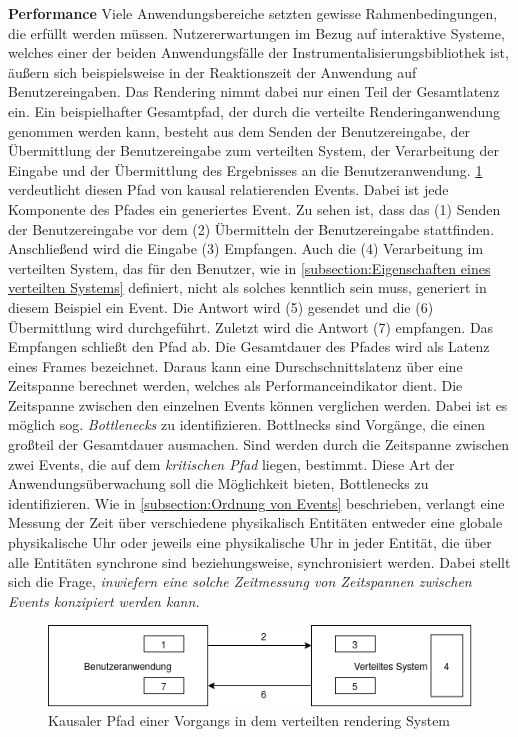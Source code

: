 \textbf{Performance} \space\space\space 
Viele Anwendungsbereiche setzten gewisse Rahmenbedingungen, die erfüllt werden müssen. 
Nutzererwartungen im Bezug auf interaktive Systeme, welches einer der beiden Anwendungsfälle der Instrumentalisierungsbibliothek ist, äußern sich beispielsweise in der Reaktionszeit der Anwendung auf Benutzereingaben. 
Das Rendering nimmt dabei nur einen Teil der Gesamtlatenz ein.
Ein beispielhafter Gesamtpfad, der durch die verteilte Renderinganwendung genommen werden kann, besteht aus dem Senden der Benutzereingabe, der Übermittlung der Benutzereingabe zum verteilten System, der Verarbeitung der Eingabe und der Übermittlung des Ergebnisses an die Benutzeranwendung.
\cref{fig:Anwendungsueberwachung_Gesamtsystem} verdeutlicht diesen Pfad von kausal relatierenden Events.
Dabei ist jede Komponente des Pfades ein generiertes Event.
Zu sehen ist, dass das (1) Senden der Benutzereingabe vor dem (2) Übermitteln der Benutzereingabe stattfinden.
Anschließend wird die Eingabe (3) Empfangen.
Auch die (4) Verarbeitung im verteilten System, das für den Benutzer, wie in \cref{subsection:Eigenschaften eines verteilten Systems} definiert, nicht als solches kenntlich sein muss, generiert in diesem Beispiel ein Event.
Die Antwort wird (5) gesendet und die (6) Übermittlung wird durchgeführt.
Zuletzt wird die Antwort (7) empfangen. Das Empfangen schließt den Pfad ab. Die Gesamtdauer des Pfades wird als Latenz eines Frames bezeichnet.
Daraus kann eine Durschschnittslatenz über eine Zeitspanne berechnet werden, welches als Performanceindikator dient. Die Zeitspanne zwischen den einzelnen Events können verglichen werden. Dabei ist es möglich sog. \emph{Bottlenecks} zu identifizieren. Bottlnecks sind Vorgänge, die einen großteil der Gesamtdauer ausmachen. Sind werden durch die Zeitspanne zwischen zwei Events, die auf dem \emph{kritischen Pfad} liegen, bestimmt. Diese Art der Anwendungsüberwachung soll die Möglichkeit bieten, Bottlenecks zu identifizieren. Wie in \cref{subsection:Ordnung von Events} beschrieben, verlangt eine Messung der Zeit über verschiedene physikalisch Entitäten entweder eine globale physikalische Uhr oder jeweils eine physikalische Uhr in jeder Entität, die über alle Entitäten synchrone sind beziehungsweise, synchronisiert werden. Dabei stellt sich die Frage, \emph{inwiefern eine solche Zeitmessung von Zeitspannen zwischen Events konzipiert werden kann. } 


\begin{figure}[!ht]
	\centering
	\includegraphics[scale=0.5]{img/Problembeschreibung/Anwendungsueberwachung_Gesamtsystem.png}
	\caption[Kausaler Pfad einer Vorgangs in dem verteilten rendering System]{Kausaler Pfad einer Vorgangs in dem verteilten rendering System}
	\label{fig:Anwendungsueberwachung_Gesamtsystem}
\end{figure}

